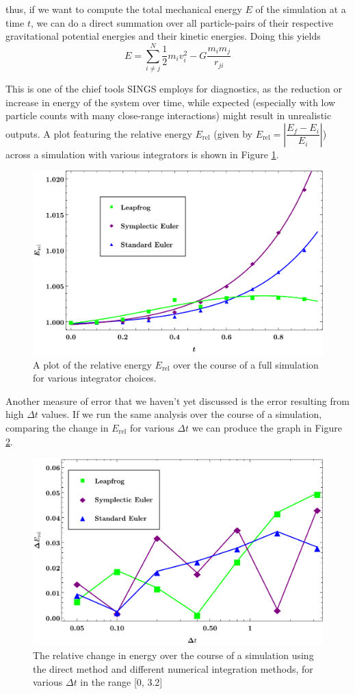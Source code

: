 \documentclass[12pt, twoside, letterpaper]{article}
\begin{document}
\noindent thus, if we want to compute the total mechanical energy $E$ of the simulation at a time $t$, we can do a direct summation over all particle-pairs of their respective gravitational potential energies and their kinetic energies. Doing this yields
\begin{equation} \label{eq:totenergy}
	E = \sum_{i \neq j}^{N} \frac{1}{2}m_iv_i^2 - G\frac{m_im_j}{r_{ji}}
\end{equation}

This is one of the chief tools SINGS employs for diagnostics, as the reduction or increase in energy of the system over time, while expected (especially with low particle counts with many close-range interactions) might result in unrealistic outputs. A plot featuring the relative energy $E_{\text{rel}}$ (given by $E_{\text{rel}} = \left|\dfrac{E_f - E_i}{E_i}\right|$) across a simulation with various integrators is shown in Figure \ref{fig:energyerror}.
\begin{figure}[h]
\caption{A plot of the relative energy $E_{\text{rel}}$ over the course of a full simulation for various integrator choices.}
\centerline{\includegraphics[width=.75\textwidth]{energyerror.pdf}}
\label{fig:energyerror}
\end{figure}

Another measure of error that we haven't yet discussed is the error resulting from high $\Delta t$ values. If we run the same analysis over the course of a simulation, comparing the change in $E_{\text{rel}}$ for various $\Delta t$ we can produce the graph in Figure \ref{fig:energydeltat}.
\begin{figure}[h!]
\caption{The relative change in energy over the course of a simulation using the direct method and different numerical integration methods, for various $\Delta t$ in the range [0, 3.2]}
\centerline{\includegraphics[width=.72\textwidth]{energydeltat.pdf}}
\label{fig:energydeltat}
\end{figure}
\end{document}
